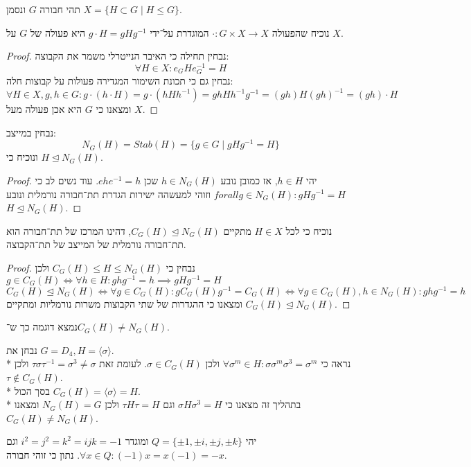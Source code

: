 \Question{}
תהי חבורה $G$ ונסמן $X = \{ H \subset G \mid H \le G \}$.

\Subquestion{}
נוכיח שהפעולה $\cdot : G \times X \to X$ המוגדרת על־ידי $g \cdot H = gHg^{-1}$ היא פעולה של $G$ על $X$.
\begin{proof}
	נבחין תחילה כי האיבר הנייטרלי משמר את הקבוצה:
	\[
		\forall H \in X : e_G H e_G^{-1} = H
	\]
	נבחין גם כי תכונת השימור המגדירה פעולות על קבוצות חלה:
	\[
		\forall H \in X, g, h \in G: g \cdot (h \cdot H) = g \cdot (hHh^{-1}) = gh H h^{-1} g^{-1} = (gh) H {(gh)}^{-1} = (gh) \cdot H
	\]
	ומצאנו כי $G$ היא אכן פעולה מעל $X$.
\end{proof}

\Subquestion{}
נבחין במייצב:
\[
	N_G(H) = Stab(H) = \{ g \in G \mid g H g^{-1} = H \}
\]
ונוכיח כי $H \trianglelefteq N_G(H)$.
\begin{proof}
	יהי $h \in H$, אז כמובן נובע $h \in N_G(H)$ שכן $e h e^{-1} = h$.
	עוד נשים לב כי $forall g \in N_G(H) : g H g^{-1} = H$ וזוהי למעשהה ישירות הגדרת תת־חבורה נורמלית ונובע $H \trianglelefteq N_G(H)$.
\end{proof}

\Subquestion{}
נוכיח כי לכל $H \in X$ מתקיים $C_G(H) \trianglelefteq N_G(H)$, דהינו המרכז של תת־חבורה הוא תת־חבורה נורמלית של המייצב של תת־הקבוצה.
\begin{proof}
	נבחין כי $C_G(H) \le H \le N_G(H)$ ולכן $g \in C_G(H) \iff \forall h \in H : g h g^{-1} = h \implies g H g^{-1} = H$
	\[
		C_G(H) \trianglelefteq N_G(H)
		\iff
		\forall g \in C_G(H) : g C_G(H) g^{-1} = C_G(H)
		\iff
		\forall g \in C_G(H), h \in N_G(H) : g h g^{-1} = h
	\]
	ומצאנו כי ההגדרות של שתי הקבוצות משרות נורמליות ומתקיים $C_G(H) \trianglelefteq N_G(H)$.
\end{proof}

\Subquestion{}
נמצא דוגמה כך ש־$C_G(H) \ne N_G(H)$.

נבחן את $G = D_4, H = \langle  \sigma \rangle$. \\*
נראה כי $\forall \sigma^m \in H : \sigma \sigma^m \sigma^3 = \sigma^m$ ולכן $\sigma \in C_G(H)$.
לעומת זאת $\tau \sigma \tau^{-1} = \sigma^3 \ne \sigma$ ולכן $\tau \notin C_G(H)$. \\*
בסך הכול $C_G(H) = \langle \sigma \rangle = H$. \\*
בתהליך זה מצאנו כי $\sigma H \sigma^3 = H$ וגם $\tau H \tau = H$ ולכן $N_G(H) = G$ ומצאנו $C_G(H) \ne N_G(H)$.

\Question{}
יהי $Q = \{ \pm 1, \pm i, \pm j, \pm k\}$ ומוגדר $i^2 = j^2 = k^2 = ijk = -1$ וגם $\forall x \in Q: (-1) x = x (-1) = -x$. נתון כי זוהי חבורה.

